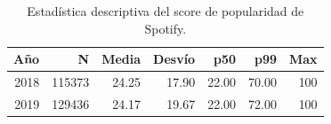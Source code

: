 \begin{table}[htbp]
\caption{Estadística descriptiva del score de popularidad de Spotify.}
\label{tab:descriptivas}
\begin{tabular}{rrrrrrr}
\toprule
Año & N & Media & Desvío & p50 & p99 & Max \\
\midrule
2018 & 115373 & 24.25 & 17.90 & 22.00 & 70.00 & 100 \\
2019 & 129436 & 24.17 & 19.67 & 22.00 & 72.00 & 100 \\
\bottomrule
\end{tabular}
\end{table}
